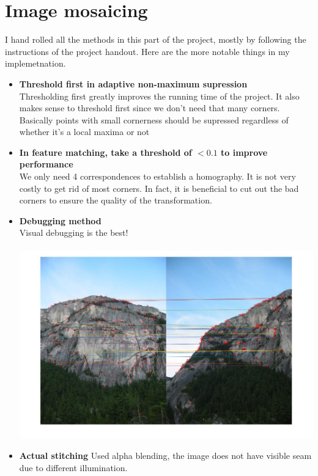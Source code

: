 \documentclass[english]{article}
\begin{document}
\section*{Image mosaicing}
I hand rolled all the methods in this part of the project, mostly by following the instructions of the project handout. Here are the more notable things in my implemetnation. 
\begin{itemize}
\item {\bf Threshold first in adaptive non-maximum supression}\\
Thresholding first greatly improves the running time of the project. It also makes sense to threshold first since we don't need that many corners. Basically points with small cornerness should be supressed regardless of whether it's a local maxima or not
\item{\bf In feature matching, take a threshold of $<0.1$ to improve performance}\\
We only need 4 correspondences to establish a homography. It is not very costly to get rid of most corners. In fact, it is beneficial to cut out the bad corners to ensure the quality of the transformation.
\item{\bf Debugging method}\\
Visual debugging is the best!\\\\
\includegraphics[scale=0.3]{mosaic/mountaindebug.jpg}

\item{\bf Actual stitching}
Used alpha blending, the image does not have visible seam due to different illumination.

\end{itemize}
\end{document}
